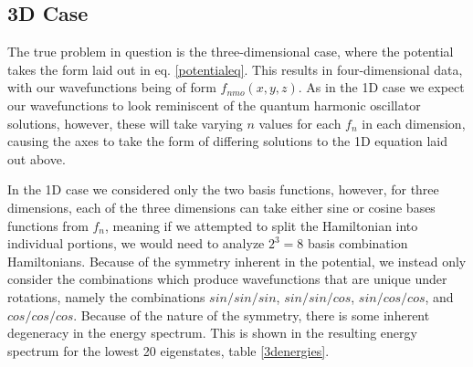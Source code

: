 \documentclass[12pt]{article}
\begin{document}
\subsection*{3D Case}
The true problem in question is the three-dimensional case, where the potential takes the form laid out in eq. \ref{potentialeq}.  This results in four-dimensional data, with our wavefunctions being of form $f_{nmo}(x,y,z)$.  As in the 1D case we expect our wavefunctions to look reminiscent of the quantum harmonic oscillator solutions, however, these will take varying $n$ values for each $f_n$ in each dimension, causing the axes to take the form of differing solutions to the 1D equation laid out above.

In the 1D case we considered only the two basis functions, however, for three dimensions, each of the three dimensions can take either sine or cosine bases functions from $f_n$, meaning if we attempted to split the Hamiltonian into individual portions, we would need to analyze $2^3 = 8$ basis combination Hamiltonians.  Because of the symmetry inherent in the potential, we instead only consider the combinations which produce wavefunctions that are unique under rotations, namely the combinations $sin/sin/sin$, $sin/sin/cos$, $sin/cos/cos$, and $cos/cos/cos$.  Because of the nature of the symmetry, there is some inherent degeneracy in the energy spectrum.  This is shown in the resulting energy spectrum for the lowest 20 eigenstates, table \ref{3denergies}.
\end{document}
